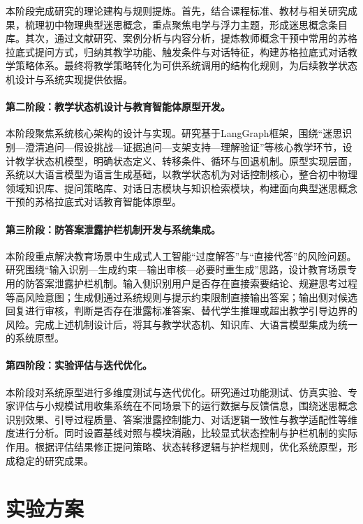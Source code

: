 本阶段完成研究的理论建构与规则提炼。首先，结合课程标准、教材与相关研究成果，梳理初中物理典型迷思概念，重点聚焦电学与浮力主题，形成迷思概念条目库。其次，通过文献研究、案例分析与内容分析，提炼教师概念干预中常用的苏格拉底式提问方式，归纳其教学功能、触发条件与对话特征，构建苏格拉底式对话教学策略体系。最终将教学策略转化为可供系统调用的结构化规则，为后续教学状态机设计与系统实现提供依据。

\paragraph{第二阶段：教学状态机设计与教育智能体原型开发。}
本阶段聚焦系统核心架构的设计与实现。研究基于LangGraph框架，围绕“迷思识别—澄清追问—假设挑战—证据追问—支架支持—理解验证”等核心教学环节，设计教学状态机模型，明确状态定义、转移条件、循环与回退机制。原型实现层面，系统以大语言模型为语言生成基础，以教学状态机为对话控制核心，整合初中物理领域知识库、提问策略库、对话日志模块与知识检索模块，构建面向典型迷思概念干预的苏格拉底式对话教育智能体原型。

\paragraph{第三阶段：防答案泄露护栏机制开发与系统集成。}

本阶段重点解决教育场景中生成式人工智能“过度解答”与“直接代答”的风险问题。研究围绕“输入识别—生成约束—输出审核—必要时重生成”思路，设计教育场景专用的防答案泄露护栏机制。输入侧识别用户是否存在直接索要结论、规避思考过程等高风险意图；生成侧通过系统规则与提示约束限制直接输出答案；输出侧对候选回复进行审核，判断是否存在泄露标准答案、替代学生推理或超出教学引导边界的风险。完成上述机制设计后，将其与教学状态机、知识库、大语言模型集成为统一的系统原型。




\paragraph{第四阶段：实验评估与迭代优化。}
\label{subsec:evaluation_and_iteration}

本阶段对系统原型进行多维度测试与迭代优化。研究通过功能测试、仿真实验、专家评估与小规模试用收集系统在不同场景下的运行数据与反馈信息，围绕迷思概念识别效果、引导过程质量、答案泄露控制能力、对话逻辑一致性与教学适配性等维度进行分析。同时设置基线对照与模块消融，比较显式状态控制与护栏机制的实际作用。根据评估结果修正提问策略、状态转移逻辑与护栏规则，优化系统原型，形成稳定的研究成果。

\section{实验方案}

